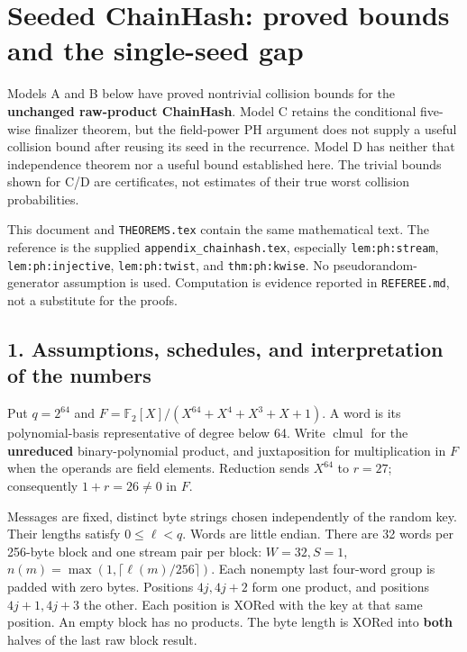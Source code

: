 \documentclass[
  11pt,
]{article}
\author{}
\date{}
\newcounter{none} %
\begin{document}
\section{Seeded ChainHash: proved bounds and the single-seed
gap}\label{seeded-chainhash-proved-bounds-and-the-single-seed-gap}

Models A and B below have proved nontrivial collision bounds for the
\textbf{unchanged raw-product ChainHash}. Model C retains the
conditional five-wise finalizer theorem, but the field-power PH argument
does not supply a useful collision bound after reusing its seed in the
recurrence. Model D has neither that independence theorem nor a useful
bound established here. The trivial bounds shown for C/D are
certificates, not estimates of their true worst collision probabilities.

This document and \texttt{THEOREMS.tex} contain the same mathematical
text. The reference is the supplied \texttt{appendix\_chainhash.tex},
especially \texttt{lem:ph:stream}, \texttt{lem:ph:injective},
\texttt{lem:ph:twist}, and \texttt{thm:ph:kwise}. No
pseudorandom-generator assumption is used. Computation is evidence
reported in \texttt{REFEREE.md}, not a substitute for the proofs.

\subsection{1. Assumptions, schedules, and interpretation of the
numbers}\label{assumptions-schedules-and-interpretation-of-the-numbers}

Put \(q=2^{64}\) and \(F=\mathbb F_2[X]/(X^{64}+X^4+X^3+X+1)\). A word
is its polynomial-basis representative of degree below 64. Write
\(\operatorname{clmul}\) for the \textbf{unreduced} binary-polynomial
product, and juxtaposition for multiplication in \(F\) when the operands
are field elements. Reduction sends \(X^{64}\) to \(r=27\); consequently
\(1+r=26\ne0\) in \(F\).

Messages are fixed, distinct byte strings chosen independently of the
random key. Their lengths satisfy \(0\le\ell<q\). Words are little
endian. There are 32 words per 256-byte block and one stream pair per
block: \(W=32,S=1\), \(n(m)=\max(1,\lceil\ell(m)/256\rceil)\). Each
nonempty last four-word group is padded with zero bytes. Positions
\(4j,4j+2\) form one product, and positions \(4j+1,4j+3\) the other.
Each position is XORed with the key at that same position. An empty
block has no products. The byte length is XORed into \textbf{both}
halves of the last raw block result.
\end{document}
